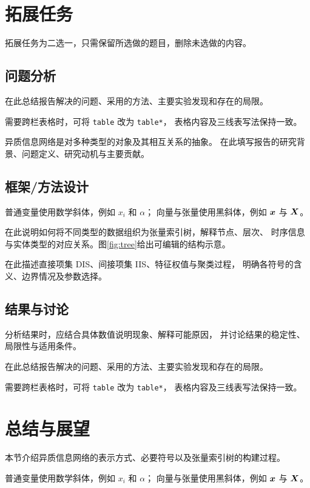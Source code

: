 \documentclass[sigconf,nonacm,screen]{acmart}
\begin{document}
\section{拓展任务}
\label{sec:extension}
拓展任务为二选一，只需保留所选做的题目，删除未选做的内容。

\subsection{问题分析}
\label{sec:ext-problem}
在此总结报告解决的问题、采用的方法、主要实验发现和存在的局限。

需要跨栏表格时，可将 \texttt{table} 改为 \texttt{table*}，
表格内容及三线表写法保持一致。

异质信息网络是对多种类型的对象及其相互关系的抽象。
在此填写报告的研究背景、问题定义、研究动机与主要贡献。

\subsection{框架/方法设计}
\label{sec:ext-method}
普通变量使用数学斜体，例如 $x_i$ 和 $\alpha$；
向量与张量使用黑斜体，例如 $\bm{x}$ 与 $\bm{X}$。

在此说明如何将不同类型的数据组织为张量索引树，解释节点、层次、
时序信息与实体类型的对应关系。图\ref{fig:tree}给出可编辑的结构示意。

在此描述直接项集 DIS、间接项集 IIS、特征权值与聚类过程，
明确各符号的含义、边界情况及参数选择。

\subsection{结果与讨论}
\label{sec:ext-result}
分析结果时，应结合具体数值说明现象、解释可能原因，
并讨论结果的稳定性、局限性与适用条件。

在此总结报告解决的问题、采用的方法、主要实验发现和存在的局限。

需要跨栏表格时，可将 \texttt{table} 改为 \texttt{table*}，
表格内容及三线表写法保持一致。

\FloatBarrier
\section{总结与展望}
\label{sec:conclusion}
\label{sec:conclusion-body}
本节介绍异质信息网络的表示方式、必要符号以及张量索引树的构建过程。

普通变量使用数学斜体，例如 $x_i$ 和 $\alpha$；
向量与张量使用黑斜体，例如 $\bm{x}$ 与 $\bm{X}$。
\end{document}
